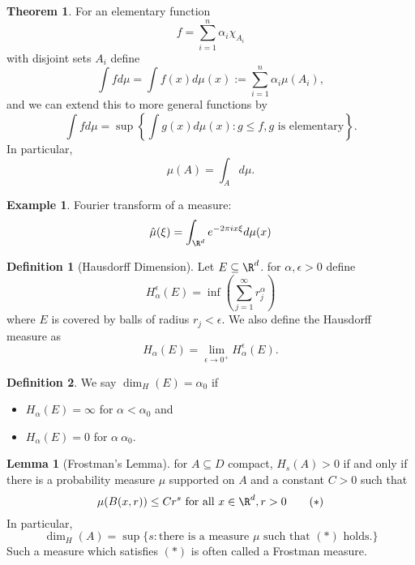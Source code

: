 \documentclass[a5paper]{article}
\theoremstyle{definition}%
\newtheorem*{theorem*}{Theorem} %
\newtheorem{lemma}[theorem]{Lemma}
\newtheorem*{definition*}{Definition}
\newtheorem*{example*}{Example}
\numberwithin{exercise}{section}
\theoremstyle{remark}%
\begin{document}
\begin{theorem*}
For an elementary function 
$$f=\sum_{i=1}^n \alpha_i\chi_{A_i}$$
with disjoint sets $A_i$ define
$$\int f d\mu = \int f(x)d\mu(x):=\sum_{i=1}^n \alpha_i\mu({A_i}),$$
and we can extend this to more general functions by 
$$\int f d\mu = \sup\left\lbrace\int g(x)d\mu(x): g\leq f, g \text{ is elementary}\right\rbrace.$$
In particular, 
$$\mu(A)=\int_A d\mu.$$
\end{theorem*}

\begin{example*}
Fourier transform of a measure:
$$\hat{\mu}(\xi)=\int_{\R^d}e^{-2\pi i x \xi}d\mu(x)$$
\end{example*}

\begin{highlight}
\begin{definition*}[Hausdorff Dimension]
Let $E\subseteq\R^d$. for $\alpha, \epsilon>0$ define 
$$H_\alpha^\epsilon(E)=\inf\left(\sum_{j=1}^\infty r_j^\alpha\right)$$
where $E$ is covered by balls of radius $r_j<\epsilon$. We also define the Hausdorff measure as 
\[H_\alpha(E)=\lim_{\epsilon\to0^+}H_\alpha^\epsilon(E).\]
\end{definition*}
\end{highlight}

\begin{highlight}
\begin{definition*}
We say $\dim_H(E)=\alpha_0$ if 
\begin{itemize}
\item $H_\alpha(E)=\infty$ for $\alpha<\alpha_0$ and 
\item $H_\alpha(E)=0$ for $\alpha\>\alpha_0$.
\end{itemize}
\end{definition*}
\end{highlight}

\begin{highlight}
\begin{lemma}[Frostman's Lemma]
for $A\subseteq D$ compact, $H_s(A)>0$ if and only if there is a probability measure $\mu$ supported on $A$ and a constant $C>0$ such that 
\begin{equation}
\mu(B(x,r))\leq C r^s \text{ for all } x\in \R^d, r>0
\tag{$*$}
\end{equation}
In particular, 
\[\dim_H(A)=\sup\{s: \text{there is a measure } \mu \text{ such that } (*) \text{ holds.}\}\]
Such a measure which satisfies $(*)$ is often called a Frostman measure. 
\end{lemma}
\end{highlight}
\end{document}
